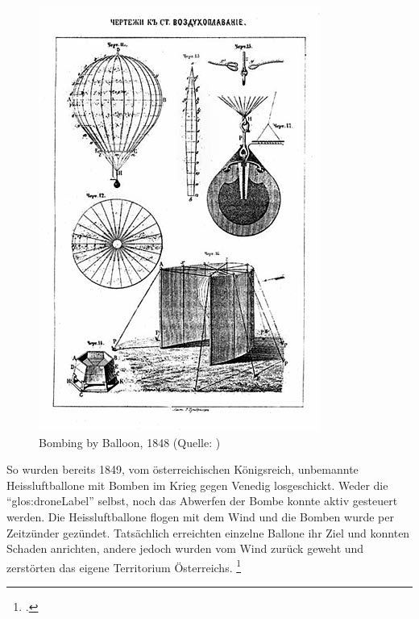 \begin{figure}
	\includegraphics[width=1.0\linewidth]{images/analysis/balloonbombs1849.jpg}
 	\caption[Bombing by Balloon, 1848]{Bombing by Balloon, 1848 (Quelle: )}
\end{figure}
So wurden bereits 1849, vom österreichischen Königsreich, unbemannte Heissluftballone mit Bomben im Krieg gegen Venedig losgeschickt.
Weder die "`\gls{glos:droneLabel}"' selbst, noch das Abwerfen der Bombe konnte aktiv gesteuert werden.
Die Heissluftballone flogen mit dem Wind und die Bomben wurde per Zeitzünder gezündet. Tatsächlich erreichten einzelne Ballone ihr Ziel und konnten Schaden anrichten, andere jedoch wurden vom Wind zurück geweht und zerstörten das eigene Territorium Österreichs. \footcite{Remote_Piloted_Aerial_Vehicles_2015-03-21}

